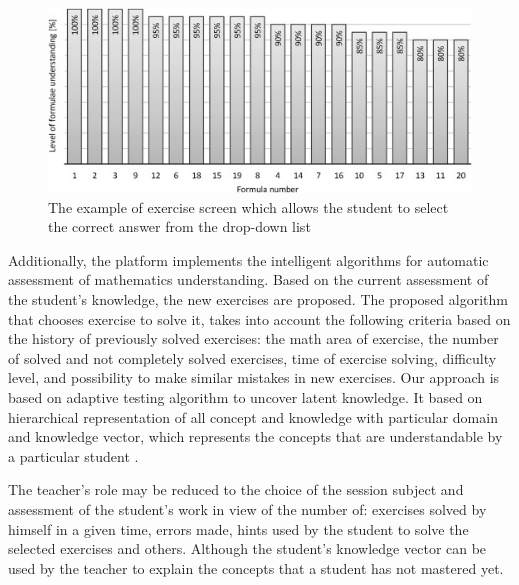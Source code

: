 \documentclass[12pt,1p]{elsarticle}
\begin{document}
\begin{figure}[t]
\centering
\includegraphics[width=5in]{./pics/5}
\caption{The example of exercise screen which allows the student to select the
correct answer from the drop-down list}
\label{fig05}
\end{figure}	
	
	Additionally, the platform implements the intelligent algorithms for automatic assessment of mathematics understanding. Based on the current assessment of the student's knowledge, the new exercises are proposed. The proposed algorithm that chooses exercise to solve it, takes into account the following criteria based on the history of previously solved exercises: the math area of exercise, the number of solved and not completely solved exercises, time of exercise solving, difficulty level, and possibility to make similar mistakes in new exercises. Our approach is based on adaptive testing algorithm to uncover latent knowledge. It based on hierarchical representation of all concept and knowledge with particular domain and knowledge vector, which represents the concepts that are understandable by a particular student \cite{Lynch:2014}.
	
	The teacher's role may be reduced to the choice of the session subject and assessment of the student's work in view of the number of: exercises solved by himself in a given time, errors made, hints used by the student to solve the selected exercises and others. Although the student's knowledge vector can be used by the teacher to explain the concepts that a student has not mastered yet.
\end{document}
